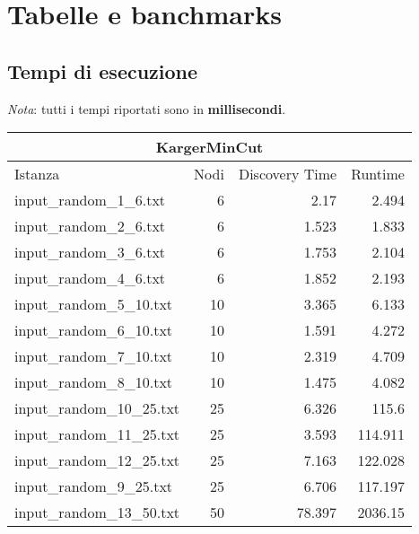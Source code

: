 \section{Tabelle e banchmarks}
\label{cap:tables-and-benchmarks}

\subsection{Tempi di esecuzione}
\label{sec:runtime-tables}

\emph{Nota}: tutti i tempi riportati sono in \textbf{millisecondi}.

\begin{table}[H]
    \centering

    \begin{tabular}{lrrr}
     \hline
     \multicolumn{4}{c}{KargerMinCut} \\
     \hline
     Istanza                    &   Nodi &   Discovery Time  &        Runtime \\
     \hline
     input\_random\_1\_6.txt    &       6 &            2.17  &          2.494 \\
     input\_random\_2\_6.txt    &       6 &            1.523 &          1.833 \\
     input\_random\_3\_6.txt    &       6 &            1.753 &          2.104 \\
     input\_random\_4\_6.txt    &       6 &            1.852 &          2.193 \\
     input\_random\_5\_10.txt   &      10 &            3.365 &          6.133 \\
     input\_random\_6\_10.txt   &      10 &            1.591 &          4.272 \\
     input\_random\_7\_10.txt   &      10 &            2.319 &          4.709 \\
     input\_random\_8\_10.txt   &      10 &            1.475 &          4.082 \\
     input\_random\_10\_25.txt  &      25 &            6.326 &        115.6   \\
     input\_random\_11\_25.txt  &      25 &            3.593 &        114.911 \\
     input\_random\_12\_25.txt  &      25 &            7.163 &        122.028 \\
     input\_random\_9\_25.txt   &      25 &            6.706 &        117.197 \\
     input\_random\_13\_50.txt  &      50 &           78.397 &       2036.15  \\

\end{tabular}
\end{table}
